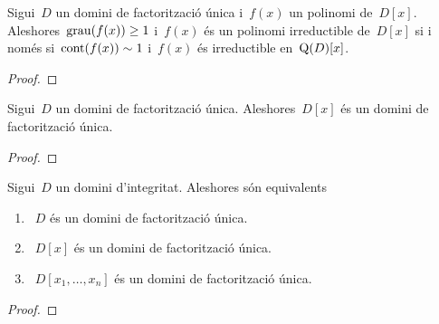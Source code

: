 \documentclass[../../main.tex]{subfiles}
\begin{document}
    \begin{theorem}
        Sigui~\(D\) un domini de factorització única i~\(f(x)\) un polinomi de~\(D[x]\).
        Aleshores~\(\operatorname{grau}(f(x))\geq1\) i~\(f(x)\) és un polinomi irreductible de~\(D[x]\) si i només si~\(\operatorname{cont}(f(x))\sim1\) i~\(f(x)\) és irreductible en~\(\operatorname{Q}(D)[x]\).
        \begin{proof}
        \end{proof}
    \end{theorem}
    \begin{theorem}
        Sigui~\(D\) un domini de factorització única.
        Aleshores~\(D[x]\) és un domini de factorització única.
        \begin{proof}
        \end{proof}
    \end{theorem}
    \begin{theorem}
        Sigui~\(D\) un domini d'integritat.
        Aleshores són equivalents
        \begin{enumerate}
            \item~\(D\) és un domini de factorització única.
            \item~\(D[x]\) és un domini de factorització única.
            \item~\(D[x_{1},\dots,x_{n}]\) és un domini de factorització única.
        \end{enumerate}
        \begin{proof}
        \end{proof}
    \end{theorem}
\end{document}
